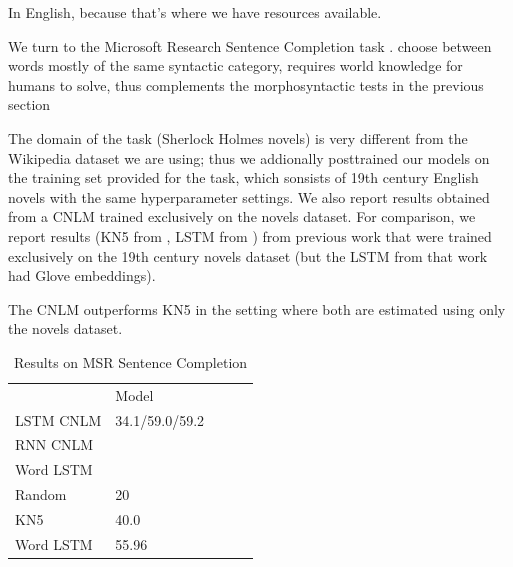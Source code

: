 In English, because that's where we have resources available.



We turn to the Microsoft Research Sentence Completion task \cite{Zweig:Burges:2011}.
choose between words mostly of the same syntactic category, requires world knowledge for humans to solve, thus complements the morphosyntactic tests in the previous section

The domain of the task (Sherlock Holmes novels) is very different from the Wikipedia dataset we are using; thus we addionally posttrained our models on the training set provided for the task, which sonsists of 19th century English novels with the same hyperparameter settings.
We also report results obtained from a CNLM trained exclusively on the novels dataset.
For comparison, we report results (KN5 from \cite{Mikolov:2012}, LSTM from \cite{zhang2016top}) from previous work that were trained exclusively on the 19th century novels dataset (but the LSTM from that work had Glove embeddings). %


The CNLM outperforms KN5 in the setting where both are estimated using only the novels dataset.

\begin{table}[t]
  \begin{center}
    \begin{tabular}{l|l|l|l|l}
      \multicolumn{1}{c}{}& Model \\
LSTM CNLM	    &      34.1/59.0/59.2 \\
	    RNN CNLM & \\
	    Word LSTM \\ \hline
	    Random & 20 \\
	    KN5   & 40.0 \\
	    Word LSTM & 55.96 \\
    \end{tabular}
  \end{center}
  \caption{\label{tab:msr-completion-results} Results on MSR Sentence Completion}
\end{table}




